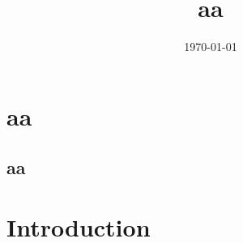 ﻿\documentclass[UTF8,fontset=adobe]{ctexart}
\title{aa}
\date{\today}
\begin{document}
\maketitle

\section{aa}
\subsection{aa}
\section{Introduction}
\end{document}
